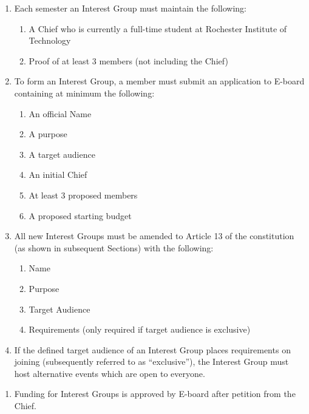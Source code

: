 \begin{enumerate}
      \item Each semester an Interest Group must maintain the following:
            \begin{enumerate}
                  \item A Chief who is currently a full-time student at Rochester Institute of
                        Technology
                  \item Proof of at least 3 members (not including the Chief)
            \end{enumerate}
      \item To form an Interest Group, a member must submit an application to E-board
            containing at minimum the following:
            \begin{enumerate}
                  \item An official Name
                  \item A purpose
                  \item A target audience
                  \item An initial Chief
                  \item At least 3 proposed members
                  \item A proposed starting budget
            \end{enumerate}
      \item All new Interest Groups must be amended to Article 13 of the constitution (as
            shown in subsequent Sections) with the following:
            \begin{enumerate}
                  \item Name
                  \item Purpose
                  \item Target Audience
                  \item Requirements (only required if target audience is exclusive)
            \end{enumerate}
      \item If the defined target audience of an Interest Group places requirements on
            joining (subsequently referred to as ``exclusive''), the Interest Group must
            host alternative events which are open to everyone.
\end{enumerate}


\begin{enumerate}
      \item Funding for Interest Groups is approved by E-board after petition from the
            Chief.
\end{enumerate}


% 
% 
% 
% 